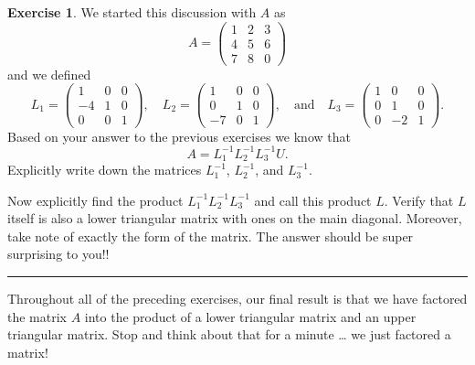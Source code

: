 \documentclass[
]{book}
\theoremstyle{definition}
\theoremstyle{definition}
\theoremstyle{definition}
\newtheorem{exercise}{Exercise}[chapter]
\theoremstyle{remark}
\begin{document}
\begin{exercise}
\protect\hypertarget{exr:unnamed-chunk-319}{}{\label{exr:unnamed-chunk-319} }We started this discussion with \(A\) as
\[ A = \begin{pmatrix} 1 & 2 & 3 \\ 4 & 5 & 6 \\ 7 & 8 & 0 \end{pmatrix} \]
and we defined
\[ L_1 = \begin{pmatrix} 1 & 0 & 0 \\ -4 & 1 & 0 \\ 0 & 0 & 1 \end{pmatrix}, \quad L_2 = \begin{pmatrix} 1 & 0 & 0 \\ 0 & 1 & 0 \\ -7 & 0 & 1 \end{pmatrix}, \quad \text{and} \quad L_3 = \begin{pmatrix} 1 & 0 & 0 \\ 0 & 1 & 0 \\ 0 & -2 & 1 \end{pmatrix}.  \]
Based on your answer to the previous exercises we know that
\[ A = L_1^{-1} L_2^{-1} L_3^{-1} U. \]
Explicitly write down the matrices \(L_1^{-1}\), \(L_2^{-1}\), and \(L_3^{-1}\).

Now explicitly find the product \(L_1^{-1} L_2^{-1} L_3^{-1}\) and call this product \(L\). Verify that \(L\) itself is also a lower triangular matrix with ones on the main diagonal. Moreover, take note of exactly the form of the matrix. The answer should be super surprising to you!!
\end{exercise}

\begin{center}\rule{0.5\linewidth}{0.5pt}\end{center}

Throughout all of the preceding exercises, our final result is that we have factored the matrix \(A\) into the product of a lower triangular matrix and an upper triangular matrix. Stop and think about that for a minute \ldots{} we just factored a matrix!
\end{document}
